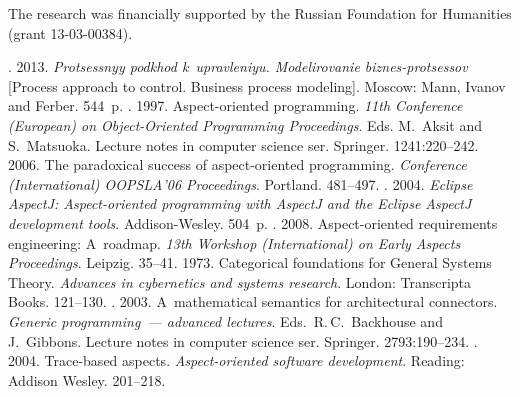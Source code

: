 \Ack
\noindent
The research was financially supported by the Russian Foundation for
Humanities (grant 13-03-00384).




 \begin{multicols}{2}

\renewcommand{\bibname}{\protect\rmfamily References}



{\small\frenchspacing
 {%
 \begin{thebibliography}{99}
. 2013. \textit{Protsessnyy podkhod k~upravleniyu.
Modelirovanie biz\-nes-pro\-tses\-sov} [Process approach to control. Business process
modeling].
Moscow: Mann, Ivanov and Ferber. 544~p.
. 1997. Aspect-oriented programming.
\textit{11th Conference (European) on Object-Oriented
Programming Proceedings}. Eds. M.~Aksit and S.~Matsuoka.
Lecture notes in computer science ser. Springer. 1241:220--242.
 2006. The paradoxical success of aspect-oriented programming.
\textit{Conference (International) \mbox{OOPSLA}'06 Proceedings}. Portland. 481--497.
. 2004. \textit{Eclipse AspectJ:
Aspect-oriented programming with AspectJ and the Eclipse AspectJ development tools}.
Addison-Wesley. 504~p.
. 2008. Aspect-oriented requirements engineering: A~roadmap.
\textit{13th Workshop (International) on Early Aspects Proceedings}. Leipzig. 35--41.
 1973. Categorical foundations for General Systems Theory. \textit{Advances in
cybernetics and systems research}. London: Transcripta Books. 121--130.
. 2003. A~mathematical semantics for
architectural connectors. \textit{Generic programming~--- advanced lectures}.
Eds.\ R.\,C.~Backhouse and J.~Gibbons. Lecture notes in computer science ser.
Springer. 2793:190--234.
. 2004. Trace-based aspects.
\textit{Aspect-oriented software development}. Reading: Addison Wesley. 201--218.

\end{thebibliography}}}
\end{multicols}
